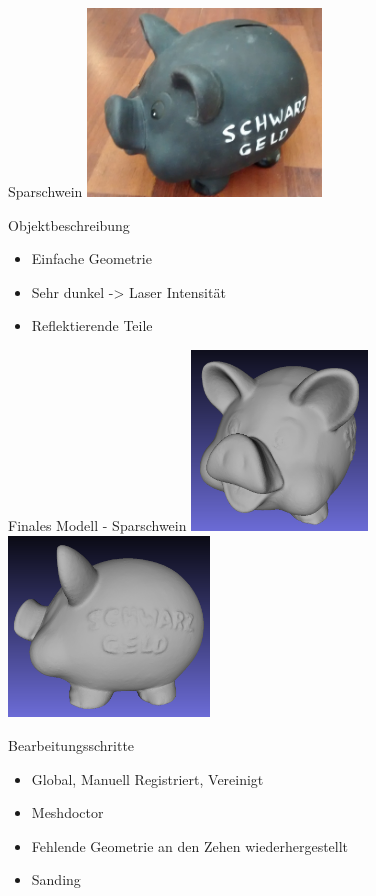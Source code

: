 \documentclass[11pt]{beamer}
\begin{document}
\begin{frame}{Sparschwein}
\center
	\includegraphics[height=5cm]{images/sparschwein/photo.jpg}
	\begin{block}{Objektbeschreibung}
		\begin{itemize}
			\item Einfache Geometrie
			\item Sehr dunkel -> Laser Intensität
			\item Reflektierende Teile
		\end{itemize}
	\end{block}

\end{frame}

\begin{frame}{Finales Modell - Sparschwein}
\center
	\includegraphics[height=4.8cm]{images/sparschwein/final2}
	\includegraphics[height=4.8cm]{images/sparschwein/final3}
	\begin{block}{Bearbeitungsschritte}
		\begin{itemize}
			\item Global, Manuell Registriert, Vereinigt
			\item Meshdoctor
			\item Fehlende Geometrie an den Zehen wiederhergestellt
			\item Sanding
		\end{itemize}
	\end{block}
\end{frame}
\end{document}
